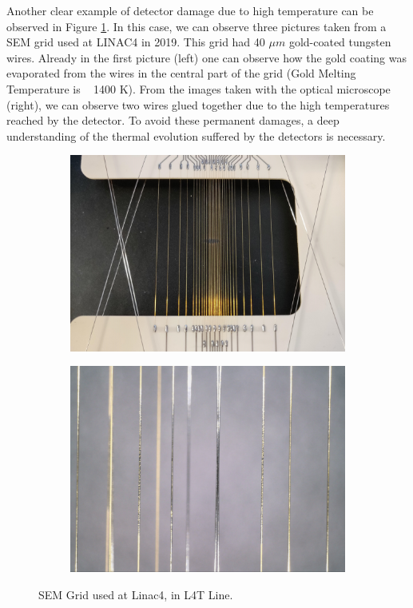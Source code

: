 Another clear example of detector damage due to high temperature can be observed in Figure \ref{fig:SEMLinac4damage}. In this case, we can observe three pictures taken from a SEM grid used at LINAC4 in 2019. This grid had 40 $\mu m$ gold-coated tungsten wires. Already in the first picture (left) one can observe how the gold coating was evaporated from the wires in the central part of the grid (Gold Melting Temperature is ~ 1400 K). From the images taken with the optical microscope (right), we can observe two wires glued together due to the high temperatures reached by the detector. To avoid these permanent damages, a deep understanding of the thermal evolution suffered by the detectors is necessary. 
\begin{figure}[h]
    \centering
    \begin{subfigure}[b]{0.42\textwidth}
        \includegraphics[width=\textwidth]{SEMgridDamage/GridDamage1.jpg}
    \end{subfigure}
    \hspace{0.5cm}
    \begin{subfigure}[b]{0.4\textwidth}
        \includegraphics[width=\textwidth]{SEMgridDamage/GridDamage2.png}
    \end{subfigure}
    \caption{SEM Grid used at Linac4, in L4T Line.  }
    \label{fig:SEMLinac4damage}
\end{figure}

